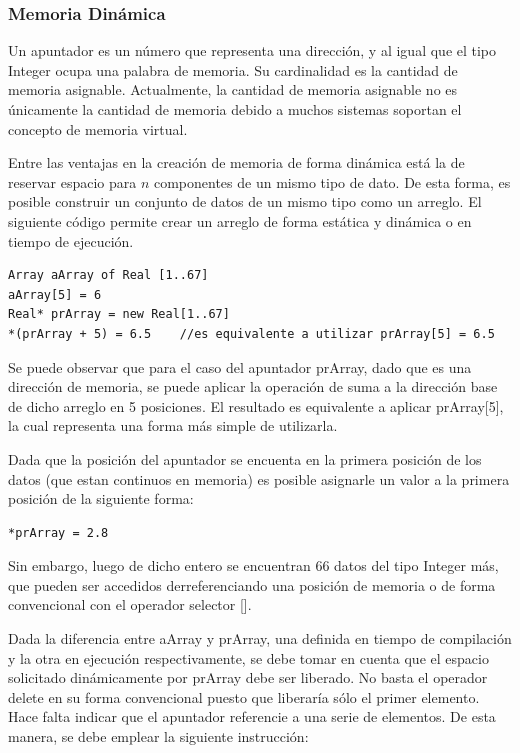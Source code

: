 \subsubsection{Memoria Dinámica}

Un apuntador es un número que representa una dirección, y al igual que el tipo Integer ocupa una palabra de memoria. Su cardinalidad es la cantidad de memoria asignable. Actualmente, la cantidad de memoria asignable no es únicamente la cantidad de memoria debido a muchos sistemas soportan el concepto de memoria virtual.

Entre las ventajas en la creación de memoria de forma dinámica está la de reservar espacio para $n$ componentes de un mismo tipo de dato. De esta forma, es posible construir un conjunto de datos de un mismo tipo como un arreglo. El siguiente código permite crear un arreglo de forma estática y dinámica o en tiempo de ejecución.

\begin{lstlisting}[upquote=true, language=pseudo]
Array aArray of Real [1..67]
aArray[5] = 6
Real* prArray = new Real[1..67]
*(prArray + 5) = 6.5  	//es equivalente a utilizar prArray[5] = 6.5
\end{lstlisting}

Se puede observar que para el caso del apuntador prArray, dado que es una dirección de memoria, se puede aplicar la operación de suma a la dirección base de dicho arreglo en 5 posiciones. El resultado es equivalente a aplicar prArray[5], la cual representa una forma más simple de utilizarla.

Dada que la posición del apuntador se encuenta en la primera posición de los datos (que estan continuos en memoria) es posible asignarle un valor a la primera posición de la siguiente forma:

\begin{lstlisting}[upquote=true, language=pseudo]
*prArray = 2.8
\end{lstlisting}

Sin embargo, luego de dicho entero se encuentran 66 datos del tipo Integer más, que pueden ser accedidos derreferenciando una posición de memoria o de forma convencional con el operador selector [].

Dada la diferencia entre aArray y prArray, una definida en tiempo de compilación y la otra en ejecución respectivamente, se debe tomar en cuenta que el espacio solicitado dinámicamente por prArray debe ser liberado. No basta el operador delete en su forma convencional puesto que liberaría sólo el primer elemento. Hace falta indicar que el apuntador referencie a una serie de elementos. De esta manera, se debe emplear la siguiente instrucción:

